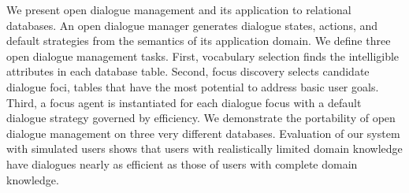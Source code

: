 We present open dialogue management and its application to relational databases. An open dialogue manager generates dialogue states, actions, and
 default strategies from the semantics of its application domain. We define
 three open dialogue management tasks. First, vocabulary selection finds the
 intelligible attributes in each database table. Second, focus discovery selects
 candidate dialogue foci, tables that have the most potential to address basic
 user goals. Third, a focus agent is instantiated for each dialogue focus with a
 default dialogue strategy governed by efficiency. We demonstrate the
 portability of open dialogue management on three very different databases.
 Evaluation of our system with simulated users shows that users with
 realistically limited domain knowledge have dialogues nearly as efficient as
 those of users with complete domain knowledge.

